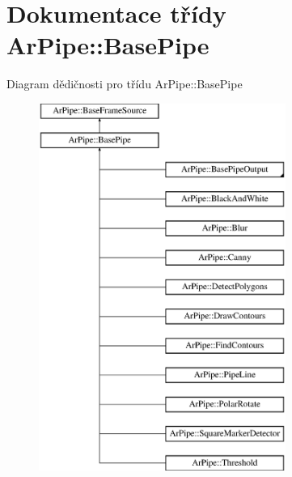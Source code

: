 \hypertarget{class_ar_pipe_1_1_base_pipe}{\section{Dokumentace třídy Ar\-Pipe\-:\-:Base\-Pipe}
\label{dd/d99/class_ar_pipe_1_1_base_pipe}
}
Diagram dědičnosti pro třídu Ar\-Pipe\-:\-:Base\-Pipe\begin{figure}[H]
\begin{center}
\leavevmode
\includegraphics[height=12.000000cm]{dd/d99/class_ar_pipe_1_1_base_pipe}
\end{center}
\end{figure}

